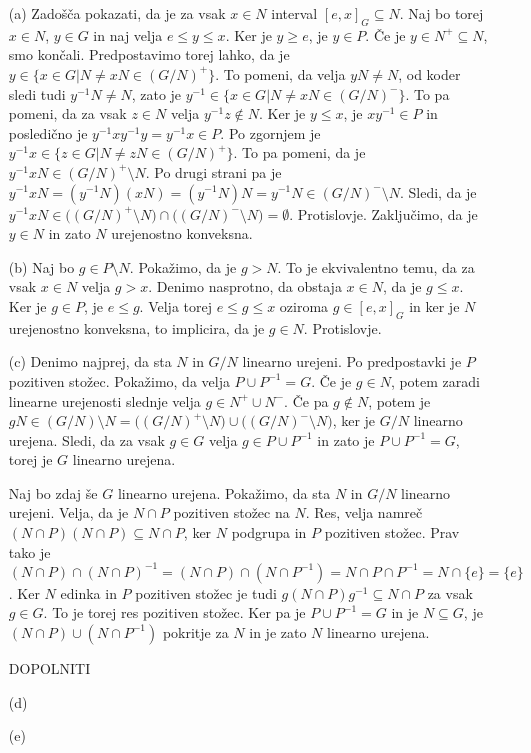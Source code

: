 \documentclass[a4paper, 12pt]{article}
\begin{document}
\begin{enumerate}
\item[(a)]Zadošča pokazati, da je za vsak $x\in N$ interval $[e,x]_G\subseteq N$. Naj bo torej $x\in N$, $y\in G$ in naj velja $e\le y\le x$. Ker je $y\ge e$, je $y\in P$. Če je $y\in N^+ \subseteq N$, smo končali. Predpostavimo torej lahko, da je $y\in \{x\in G| N \neq xN \in (G/N)^+\}$. To pomeni, da velja $yN\neq N$, od koder sledi tudi $y^{-1}N \neq N$, zato je $y^{-1} \in \{ x\in G| N \neq xN \in (G/N)^-\}$. To pa pomeni, da za vsak $z \in N$ velja $y^{-1} z \notin N$. Ker je $y\le x$, je $xy^{-1} \in P$ in posledično je $y^{-1} xy^{-1} y = y^{-1} x \in P$. Po zgornjem je $y^{-1} x \in \{z\in G| N\neq zN \in (G/N)^+\}$. To pa pomeni, da je $y^{-1}xN \in (G/N)^+ \setminus N$. Po drugi strani pa je $y^{-1} x N = (y^{-1}N ) (xN) = (y^{-1} N)N = y^{-1}N \in (G/N)^- \setminus N$. Sledi, da je $y^{-1} xN \in \big((G/N)^+ \setminus N\big) \cap \big( (G/N)^- \setminus N\big)=\emptyset$. Protislovje. Zaključimo, da je $y\in N$ in zato $N$ urejenostno konveksna.

\item[(b)] Naj bo $g\in P\setminus N$. Pokažimo, da je $g> N$. To je ekvivalentno temu, da za vsak $x\in N$ velja $g> x$. Denimo nasprotno, da obstaja $x\in N$, da je $g\le x$. Ker je $g\in P$, je $e \le g$. Velja torej $e \le g \le x$  oziroma $g\in [e,x]_G$  in ker je  $N$ urejenostno konveksna, to implicira, da je $g\in N$. Protislovje.

\item[(c)] Denimo najprej, da sta $N$ in $G/N$ linearno urejeni. Po predpostavki je $P$ pozitiven stožec. Pokažimo, da velja $P\cup P^{-1} = G$. Če je $g\in N$, potem zaradi linearne urejenosti slednje velja $g\in N^+ \cup N^-$. Če pa $g\notin N$, potem je $gN\in (G/N)\setminus N= \big((G/N)^+ \setminus N\big) \cup \big((G/N)^- \setminus N\big)$, ker je $G/N$ linearno urejena. Sledi, da za vsak $g\in G$ velja $g\in P\cup P^{-1}$ in zato je  $P\cup P^{-1} = G$, torej je $G$ linearno urejena.

Naj bo zdaj še $G$ linearno urejena. Pokažimo, da sta $N$ in $G/N$ linearno urejeni. Velja, da je $N\cap P$ pozitiven stožec na $N$. Res, velja namreč $(N\cap P)(N\cap P)\subseteq N\cap P$, ker $N$ podgrupa in $P$ pozitiven stožec. Prav tako je $(N\cap P) \cap (N\cap P)^{-1}  = (N\cap P ) \cap (N\cap P^{-1}) = N \cap P \cap P^{-1} = N\cap \{e\} = \{e\}$. Ker $N$ edinka in $P$ pozitiven stožec je tudi $g(N\cap P) g^{-1} \subseteq N\cap P$ za vsak $g\in G$. To je torej res pozitiven stožec. Ker pa je $P\cup P^{-1} = G$ in je $N\subseteq G$, je $(N\cap P) \cup (N\cap P^{-1})$ pokritje za $N$ in je zato $N$ linearno urejena.

DOPOLNITI
\item[(d)]
\item[(e)]
\end{enumerate}
\end{document}
